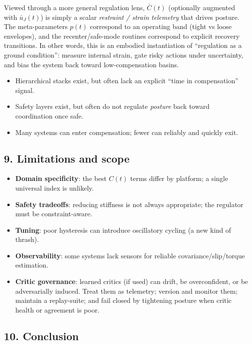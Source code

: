 \documentclass[11pt]{article}
\providecommand{\tightlist}{%
  \setlength{\itemsep}{0pt}\setlength{\parskip}{0pt}}
\begin{document}
\medskip
Viewed through a more general regulation lens, \(\bar C(t)\) (optionally augmented with \(\bar u_{J}(t)\)) is simply a scalar \emph{restraint / strain telemetry} that drives posture. The meta-parameters \(p(t)\) correspond to an operating band (tight vs loose envelopes), and the recenter/safe-mode routines correspond to explicit recovery transitions. In other words, this is an embodied instantiation of ``regulation as a ground condition'': measure internal strain, gate risky actions under uncertainty, and bias the system back toward low-compensation basins.

\begin{itemize}
\tightlist
\item
  Hierarchical stacks exist, but often lack an explicit ``time in compensation'' signal.
\item
  Safety layers exist, but often do not regulate \emph{posture} back toward coordination once safe.
\item
  Many systems can enter compensation; fewer can reliably and quickly exit.
\end{itemize}

\hypertarget{limitations-and-scope}{%
\subsection{9. Limitations and scope}\label{limitations-and-scope}}

\begin{itemize}
\tightlist
\item
  \textbf{Domain specificity}: the best \(C(t)\) terms differ by platform; a single universal index is unlikely.
\item
  \textbf{Safety tradeoffs}: reducing stiffness is not always appropriate; the regulator must be constraint-aware.
\item
  \textbf{Tuning}: poor hysteresis can introduce oscillatory cycling (a new kind of thrash).
\item
  \textbf{Observability}: some systems lack sensors for reliable covariance/slip/torque estimation.
\item
  \textbf{Critic governance}: learned critics (if used) can drift, be overconfident, or be adversarially induced. Treat them as telemetry; version and monitor them; maintain a replay-suite; and fail closed by tightening posture when critic health or agreement is poor.
\end{itemize}

\hypertarget{conclusion}{%
\subsection{10. Conclusion}\label{conclusion}}
\end{document}
